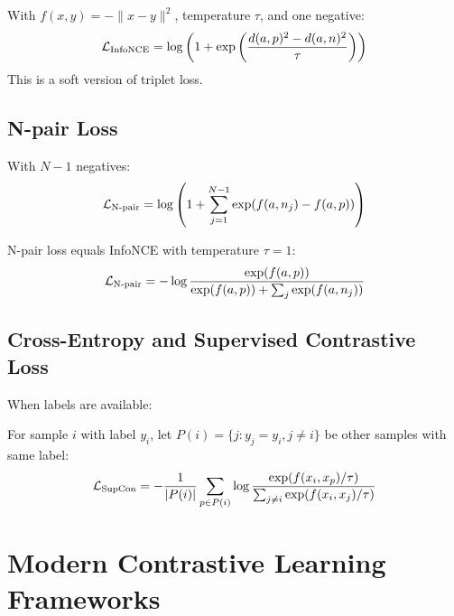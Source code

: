 \begin{notechapter}
\begin{proposition}
With $f(x,y) = -\|x - y\|^2$, temperature $\tau$, and one negative:
\begin{equation}
\mathcal{L}_{\text{InfoNCE}} = \log\left(1 + \exp\left(\frac{d(a,p)^2 - d(a,n)^2}{\tau}\right)\right)
\end{equation}
This is a soft version of triplet loss.
\end{proposition}

\subsection{N-pair Loss}

\begin{definition}
With $N-1$ negatives:
\begin{equation}
\mathcal{L}_{\text{N-pair}} = \log\left(1 + \sum_{j=1}^{N-1} \exp(f(a, n_j) - f(a, p))\right)
\end{equation}
\end{definition}

\begin{proposition}
N-pair loss equals InfoNCE with temperature $\tau = 1$:
\begin{equation}
\mathcal{L}_{\text{N-pair}} = -\log \frac{\exp(f(a,p))}{\exp(f(a,p)) + \sum_j \exp(f(a,n_j))}
\end{equation}
\end{proposition}

\subsection{Cross-Entropy and Supervised Contrastive Loss}

When labels are available:

\begin{definition}
For sample $i$ with label $y_i$, let $P(i) = \{j : y_j = y_i, j \neq i\}$ be other samples with same label:
\begin{equation}
\mathcal{L}_{\text{SupCon}} = -\frac{1}{|P(i)|} \sum_{p \in P(i)} \log \frac{\exp(f(x_i, x_p)/\tau)}{\sum_{j \neq i} \exp(f(x_i, x_j)/\tau)}
\end{equation}
\end{definition}

\section{Modern Contrastive Learning Frameworks}


\end{notechapter}
